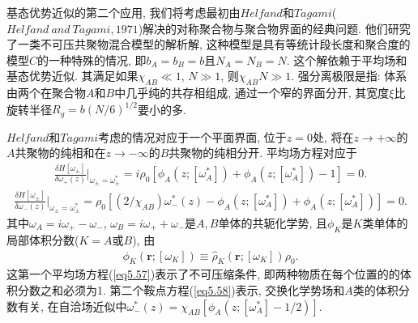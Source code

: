 \par
基态优势近似的第二个应用, 我们将考虑最初由$Helfand$和$Tagami$($Helfand\ and\ Tagami, 1971$)解决的对称聚合物与聚合物界面的经典问题.
他们研究了一类不可压共聚物混合模型的解析解,
这种模型是具有等统计段长度和聚合度的模型$C$的一种特殊的情况,
即$b_{A}=b_{B}=b$且$N_{A}=N_{B}=N$. 这个解依赖于平均场和基态优势近似.
其满足如果$\chi_{AB}\ll 1$, $N\gg 1$, 则$\chi_{AB}N\gg 1$. 强分离极限是指:
体系由两个在聚合物$A$和$B$中几乎纯的共存相组成, 通过一个窄的界面分开,
其宽度$\xi$比旋转半径$R_{g}=b(N/6)^{1/2}$要小的多.
\par
$Helfand$和$Tagami$考虑的情况对应于一个平面界面, 位于$z=0$处,
将在$z\longrightarrow +\infty$的$A$共聚物的纯相和在$z\longrightarrow
-\infty$的$B$共聚物的纯相分开. 平均场方程对应于
\label{subsec.equations}
    \begin{equation}
        \begin{aligned}
            \frac{\delta H[\omega_{\pm}]}{\delta
            \omega_{+}(z)}|_{\omega_{\pm}=\omega^{*}_{\pm}}=i\rho_{0}[\phi_{A}(z;
            [\omega^{*}_{A}])+\phi_{A}(z;
            [\omega^{*}_{A}])-1]=0.
                   \end{aligned}
        \label{eq5.57}
    \end{equation}
\label{subsec.equations}
    \begin{equation}
        \begin{aligned}
            \frac{\delta H[\omega_{\pm}]}{\delta
            \omega_{-}(z)}|_{\omega_{\pm}=\omega^{*}_{\pm}}=\rho_{0}[(2/\chi_{AB})\omega^{*}_{-}(z)-\phi_{A}(z;
            [\omega^{*}_{A}])+\phi_{A}(z;
            [\omega^{*}_{A}])]=0.
                   \end{aligned}
        \label{eq5.58}
    \end{equation}
其中$\omega_{A}=i\omega_{+}-\omega_{-}$,
$\omega_{B}=i\omega_{+}+\omega_{-}$是$A,B$单体的共轭化学势,
且$\phi_{K}$是$K$类单体的局部体积分数($K=A$或$B$), 由
\label{subsec.equations}
    \begin{equation}
        \begin{aligned}
        \phi_{K}(\bm{r}; [\omega_{K}])\equiv \hat{\rho}_{K}(\bm{r};
            [\omega_{K}])\rho_{0}.
        \end{aligned}
        \label{eq5.59}
    \end{equation}
这第一个平均场方程(\ref{eq5.57})表示了不可压缩条件,
即两种物质在每个位置的的体积分数之和必须为1. 第二个鞍点方程(\ref{eq5.58})表示,
交换化学势场和$A$类的体积分数有关,
在自洽场近似中$\omega^{*}_{-}(z)=\chi_{AB}[\phi_{A}(z; [\omega^{*}_{A}]-1/2)]$.
